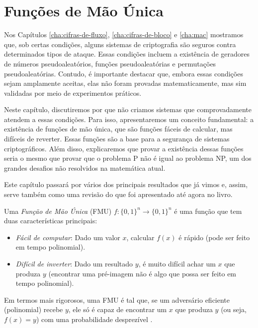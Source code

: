 \chapter{Funções de Mão Única}
\label{cha:owf}

Nos Capítulos \ref{cha:cifras-de-fluxo}, \ref{cha:cifras-de-bloco} e \ref{cha:mac} mostramos que, sob certas condições, alguns sistemas de criptografia são seguros contra determinados tipos de ataque.
Essas condições incluem a existência de geradores de números pseudoaleatórios, funções pseudoaleatórias e permutações pseudoaleatórias.
Contudo, é importante destacar que, embora essas condições sejam amplamente aceitas, elas não foram provadas matematicamente, mas sim validadas por meio de experimentos práticos.

Neste capítulo, discutiremos por que não criamos sistemas que comprovadamente atendem a essas condições.
Para isso, apresentaremos um conceito fundamental:
a existência de funções de mão única, que são funções fáceis de calcular, mas difíceis de reverter.
Essas funções são a base para a segurança de sistemas criptográficos.
Além disso, explicaremos que provar a existência dessas funções seria o mesmo que provar que o problema P não é igual ao problema NP, um dos grandes desafios não resolvidos na matemática atual.

Este capítulo passará por vários dos principais resultados que já vimos e, assim, serve também como uma revisão do que foi apresentado até agora no livro.

Uma {\em Função de Mão Única} (FMU) $f: \{0,1\}^n \to \{0,1\}^n$ é uma função que tem duas características principais:

\begin{itemize}
\item[] {\em Fácil de computar}:
  Dado um valor $x$, calcular $f(x)$ é rápido (pode ser feito em tempo polinomial).
\item[] {\em Difícil de inverter}: Dado um resultado $y$, é muito difícil achar um $x$ que produza $y$ (encontrar uma pré-imagem não é algo que possa ser feito em tempo polinomial).
\end{itemize}

Em termos mais rigorosos, uma FMU é tal que, se um adversário eficiente (polinomial) recebe $y$, ele só é capaz de encontrar um $x$ que produza $y$ (ou seja, $f(x) = y$) com uma probabilidade desprezível \cite{Diffie76,Yao82}.

